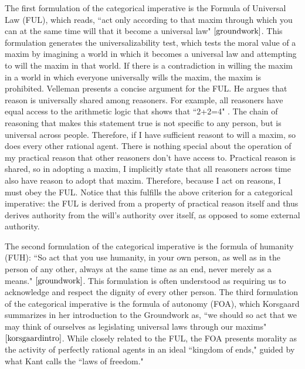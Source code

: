 \begin{isabellebody}
\begin{isamarkuptext}
The first formulation of the categorical imperative is the
Formula of Universal Law (FUL), which reads, ``act only according to that maxim through which you can 
at the same time will that it become a universal law" $\cite[34]{groundwork}$. This formulation
generates the universalizability test, which tests the moral value of a maxim by 
imagining a world in which it becomes a universal law and attempting to will the maxim in that world.
If there is a contradiction in willing the maxim in a world in which everyone universally wills the maxim,
the maxim is prohibited. 
Velleman presents a concise argument for the FUL. He argues that reason is universally shared among reasoners. For 
example, all reasoners have equal access to the arithmetic logic that shows that ``2+2=4" \cite[29]{velleman}. The chain of 
reasoning that makes this statement true is not specific to any person, but is universal across people. 
Therefore, if I have sufficient reasont to will a maxim, so does every other rational agent. There is 
nothing special about the operation of my practical reason that other reasoners don't have access to. 
Practical reason is shared, so in adopting a maxim, I implicitly state that all reasoners
across time also have reason to adopt that maxim. Therefore, because I act on reasons, I must obey the 
FUL. Notice that this fulfills the above criterion for a categorical imperative: the FUL is derived from 
a property of practical reason itself and thus derives authority from the will's authority over itself, 
as opposed to some external authority.

The second formulation of the categorical imperative is the formula of humanity (FUH): ``So act that you use humanity, 
in your own person, as well as in the person of any other, always at the same time as an end, never merely 
as a means." $\cite[41]{groundwork}$. This formulation is often understood as requiring us to 
acknowledge and respect the dignity of every other person. The third formulation of the categorical 
imperative is the formula of autonomy (FOA), which Korsgaard summarizes in her introduction to the Groundwork 
as, ``we should so act that we may think of ourselves as legislating universal laws through our 
maxims" $\cite[28]{korsgaardintro}$. While closely related to the FUL, the FOA presents morality as the activity of 
perfectly rational agents in an ideal ``kingdom of ends," guided by what Kant calls the ``laws of freedom."


\end{isamarkuptext}
\end{isabellebody}
